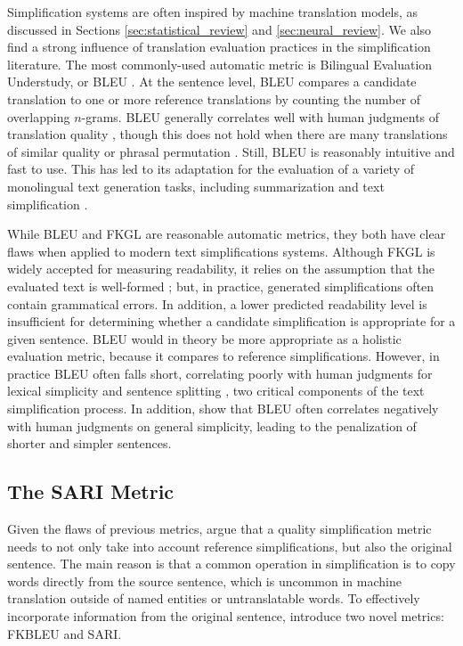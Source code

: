 \documentclass[thesis.tex]{subfiles}
\begin{document}
Simplification systems are often inspired by machine translation models, as discussed in Sections \ref{sec:statistical_review} and \ref{sec:neural_review}. We also find a strong influence of translation evaluation practices in the simplification literature. The most commonly-used automatic metric is Bilingual Evaluation Understudy, or BLEU \citep{papineni2002bleu}. At the sentence level, BLEU compares a candidate translation to one or more reference translations by counting the number of overlapping $n$-grams. BLEU generally correlates well with human judgments of translation quality \citep{papineni2002bleu,doddington2002automatic}, though this does not hold when there are many translations of similar quality or phrasal permutation \cite{callisonburch2006reevalution}. Still, BLEU is reasonably intuitive and fast to use. This has led to its adaptation for the evaluation of a variety of monolingual text generation tasks, including summarization \citep{graham2015reevaluating} and text simplification \citep{zhu2010monolingual,woodsend2011learning,wubben2012sentence}.

While BLEU and FKGL are reasonable automatic metrics, they both have clear flaws when applied to modern text simplifications systems. Although FKGL is widely accepted for measuring readability, it relies on the assumption that the evaluated text is well-formed \citep{xu2016optimizing}; but, in practice, generated simplifications often contain grammatical errors. In addition, a lower predicted readability level is insufficient for determining whether a candidate simplification is appropriate for a given sentence. BLEU would in theory be more appropriate as a holistic evaluation metric, because it compares to reference simplifications. However, in practice BLEU often falls short, correlating poorly with human judgments for lexical simplicity \citep{xu2016optimizing} and sentence splitting \citep{sulem2018bleu}, two critical components of the text simplification process. In addition, \cite{sulem2018bleu} show that BLEU often correlates negatively with human judgments on general simplicity, leading to the penalization of shorter and simpler sentences.

\subsection{The SARI Metric} \label{sec:sari}

Given the flaws of previous metrics, \cite{xu2016optimizing} argue that a quality simplification metric needs to not only take into account reference simplifications, but also the original sentence. The main reason is that a common operation in simplification is to copy words directly from the source sentence, which is uncommon in machine translation outside of named entities or untranslatable words. To effectively incorporate information from the original sentence, \cite{xu2016optimizing} introduce two novel metrics: FKBLEU and SARI.
\end{document}

